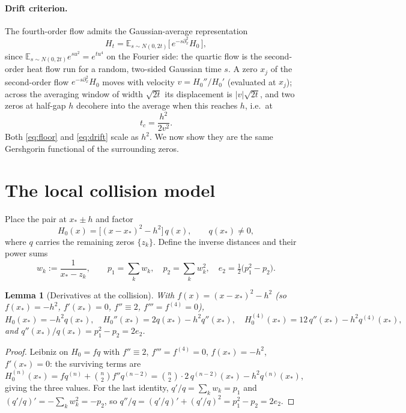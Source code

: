 \documentclass[11pt]{article}
\theoremstyle{plain}
\newtheorem{lemma}{Lemma}
\theoremstyle{definition}
\theoremstyle{remark}
\newcommand{\E}{\mathbb{E}}
\newcommand{\dx}{\partial_x}
\newcommand{\abs}[1]{\lvert #1\rvert}
\begin{document}
\paragraph{Drift criterion.} The fourth-order flow admits the Gaussian-average
representation
\begin{equation}\label{eq:avg}
  H_t=\E_{s\sim N(0,2t)}\bigl[\,e^{-s\dx^2}H_0\,\bigr],
\end{equation}
since $\E_{s\sim N(0,2t)}e^{su^2}=e^{tu^4}$ on the Fourier side: the quartic flow
is the second-order heat flow run for a random, two-sided Gaussian time $s$. A
zero $x_j$ of the second-order flow $e^{-s\dx^2}H_0$ moves with velocity
$v=H_0''/H_0'$ (evaluated at $x_j$); across the averaging window of width
$\sqrt{2t}$ its displacement is $\abs v\sqrt{2t}$, and two zeros at half-gap $h$
decohere into the average when this reaches $h$, i.e.\ at
\begin{equation}\label{eq:drift}
  t_c=\frac{h^2}{2v^2}.
\end{equation}
Both \eqref{eq:floor} and \eqref{eq:drift} scale as $h^2$. We now show they are
the same Gershgorin functional of the surrounding zeros.

\section{The local collision model}
Place the pair at $x_*\pm h$ and factor
\begin{equation}\label{eq:factor}
  H_0(x)=\bigl[(x-x_*)^2-h^2\bigr]\,q(x),\qquad q(x_*)\neq0,
\end{equation}
where $q$ carries the remaining zeros $\{z_k\}$. Define the inverse distances and
their power sums
\[
  w_k:=\frac{1}{x_*-z_k},\qquad p_1=\sum_k w_k,\quad p_2=\sum_k w_k^2,\quad
  e_2=\tfrac12\bigl(p_1^2-p_2\bigr).
\]

\begin{lemma}[Derivatives at the collision]\label{lem:loc}
With $f(x)=(x-x_*)^2-h^2$ (so $f(x_*)=-h^2$, $f'(x_*)=0$, $f''\equiv2$,
$f'''=f^{(4)}=0$),
\[
  H_0(x_*)=-h^2 q(x_*),\quad
  H_0''(x_*)=2q(x_*)-h^2 q''(x_*),\quad
  H_0^{(4)}(x_*)=12\,q''(x_*)-h^2 q^{(4)}(x_*),
\]
and $q''(x_*)/q(x_*)=p_1^2-p_2=2e_2$.
\end{lemma}
\begin{proof}
Leibniz on $H_0=fq$ with $f''\equiv2$, $f'''=f^{(4)}=0$, $f(x_*)=-h^2$,
$f'(x_*)=0$: the surviving terms are $H_0^{(n)}(x_*)=fq^{(n)}+\binom n2 f''q^{(n-2)}
=\binom n2\!\cdot\!2\,q^{(n-2)}(x_*)-h^2q^{(n)}(x_*)$, giving the three values.
For the last identity, $q'/q=\sum_k w_k=p_1$ and $(q'/q)'=-\sum_k w_k^2=-p_2$, so
$q''/q=(q'/q)'+(q'/q)^2=p_1^2-p_2=2e_2$.
\end{proof}
\end{document}
